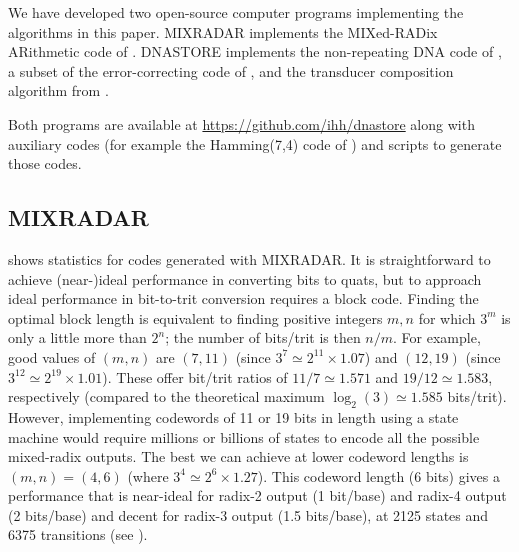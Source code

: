 \documentclass[english]{article}
\begin{document}
We have developed two open-source computer programs implementing the algorithms in this paper.
MIXRADAR implements the MIXed-RADix ARithmetic code of .
DNASTORE implements the non-repeating DNA code of ,
a subset of the error-correcting code of ,
and the transducer composition algorithm from .

Both programs are available at \url{https://github.com/ihh/dnastore}
along with auxiliary codes (for example the Hamming(7,4) code of )
and scripts to generate those codes.

\subsection{MIXRADAR}

 shows statistics for codes generated with MIXRADAR.
It is straightforward to achieve (near-)ideal performance in converting bits to quats,
but to approach ideal performance in bit-to-trit conversion requires a block code.
Finding the optimal block length is equivalent to finding
positive integers $m,n$ for which $3^m$ is only a little more than $2^n$;
the number of bits/trit is then $n/m$.
For example, good values of $(m,n)$ are $(7,11)$
(since $3^7 \simeq 2^{11} \times 1.07$)
and $(12,19)$ (since $3^{12} \simeq 2^{19} \times 1.01$).
These offer bit/trit ratios of $11/7 \simeq 1.571$ and $19/12 \simeq 1.583$, respectively
(compared to the theoretical maximum $\log_2(3) \simeq 1.585$ bits/trit).
However, implementing codewords of 11 or 19 bits in length using a state machine
would require millions or billions of states
to encode all the possible mixed-radix outputs.
The best we can achieve at lower codeword lengths is $(m,n) = (4,6)$ (where $3^4 \simeq 2^6 \times 1.27$).
This codeword length (6 bits) gives a performance that is near-ideal for radix-2 output (1 bit/base) and radix-4 output (2 bits/base)
and decent for radix-3 output (1.5 bits/base), at 2125 states and 6375 transitions (see ).

%


\end{document}
